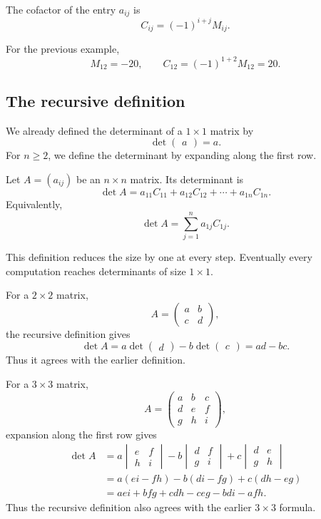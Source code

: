 \begin{definitionbox}
The cofactor of the entry \(a_{ij}\) is
\[
C_{ij}=(-1)^{i+j}M_{ij}.
\]
\end{definitionbox}

For the previous example,
\[
M_{12}=-20,
\qquad
C_{12}=(-1)^{1+2}M_{12}=20.
\]

\subsection{The recursive definition}

We already defined the determinant of a \(1\times1\) matrix by
\[
\det\begin{pmatrix}a\end{pmatrix}=a.
\]
For \(n\ge2\), we define the determinant by expanding along the first row.

\begin{definitionbox}
Let \(A=(a_{ij})\) be an \(n\times n\) matrix. Its determinant is
\[
\det A
=a_{11}C_{11}+a_{12}C_{12}+\cdots+a_{1n}C_{1n}.
\]
Equivalently,
\[
\det A=\sum_{j=1}^{n}a_{1j}C_{1j}.
\]
\end{definitionbox}

This definition reduces the size by one at every step. Eventually every computation reaches determinants of size \(1\times1\).

For a \(2\times2\) matrix,
\[
A=\begin{pmatrix}a&b\\c&d\end{pmatrix},
\]
the recursive definition gives
\[
\det A
=a\det\begin{pmatrix}d\end{pmatrix}
-b\det\begin{pmatrix}c\end{pmatrix}
=ad-bc.
\]
Thus it agrees with the earlier definition.

For a \(3\times3\) matrix,
\[
A=\begin{pmatrix}
a&b&c\\
d&e&f\\
g&h&i
\end{pmatrix},
\]
expansion along the first row gives
\[
\begin{aligned}
\det A
&=a\begin{vmatrix}e&f\\h&i\end{vmatrix}
-b\begin{vmatrix}d&f\\g&i\end{vmatrix}
+c\begin{vmatrix}d&e\\g&h\end{vmatrix}\\
&=a(ei-fh)-b(di-fg)+c(dh-eg)\\
&=aei+bfg+cdh-ceg-bdi-afh.
\end{aligned}
\]
Thus the recursive definition also agrees with the earlier \(3\times3\) formula.

